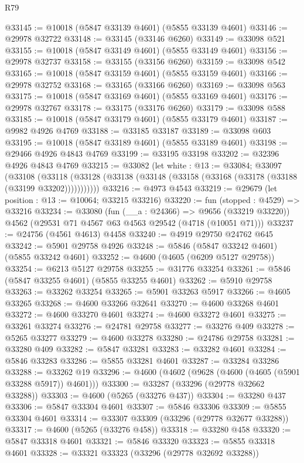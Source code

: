\begin{lexlean}{R79}
\begin{coremodule}
@33145 := @10018 (@5847 @33139 @4601) (@5855 @33139 @4601)
@33146 := @29978 @32722
@33148 := @33145 (@33146 @6260)
@33149 := @33098 @521
@33155 := @10018 (@5847 @33149 @4601) (@5855 @33149 @4601)
@33156 := @29978 @32737
@33158 := @33155 (@33156 @6260)
@33159 := @33098 @542
@33165 := @10018 (@5847 @33159 @4601) (@5855 @33159 @4601)
@33166 := @29978 @32752
@33168 := @33165 (@33166 @6260)
@33169 := @33098 @563
@33175 := @10018 (@5847 @33169 @4601) (@5855 @33169 @4601)
@33176 := @29978 @32767
@33178 := @33175 (@33176 @6260)
@33179 := @33098 @588
@33185 := @10018 (@5847 @33179 @4601) (@5855 @33179 @4601)
@33187 := @9982 @4926 @4769
@33188 := @33185 @33187
@33189 := @33098 @603
@33195 := @10018 (@5847 @33189 @4601) (@5855 @33189 @4601)
@33198 := @29466 @4926 @4843 @4769
@33199 := @33195 @33198
@33202 := @32396 @4926 @4843 @4769
@33215 := @33082
    (let white : @13 := @33084;
    @33097
      (@33108
        (@33118 (@33128 (@33138 (@33148 (@33158 (@33168 (@33178 (@33188 (@33199 @33202)))))))))))
@33216 := @4973 @4543
@33219 := @29679 (let position : @13 := @10064; @33215 @33216)
@33220 := fun (stopped : @4529) => @33216
@33234 := @33080
    (fun (__a : @24366) => @9656 (@33219 @33220))
    @4562
    (@29531 @71 @4567 @63 @4563 @29542 (@4718 (@10051 @71)))
@33237 := @24756 (@4561 @4613) @4458
@33240 := @4919 @29750 @24762 @645
@33242 := @5901 @29758 @4926
@33248 := @5846 (@5847 @33242 @4601) (@5855 @33242 @4601)
@33252 := @4600 (@4605 (@6209 @5127 @29758))
@33254 := @6213 @5127 @29758
@33255 := @31776 @33254
@33261 := @5846 (@5847 @33255 @4601) (@5855 @33255 @4601)
@33262 := @5910 @29758
@33263 := @33262 @33254
@33265 := @5901 @33263 @5917
@33266 := @4605 @33265
@33268 := @4600 @33266 @32641
@33270 := @4600 @33268 @4601
@33272 := @4600 @33270 @4601
@33274 := @4600 @33272 @4601
@33275 := @33261 @33274
@33276 := @24781 @29758
@33277 := @33276 @409
@33278 := @5265 @33277
@33279 := @4600 @33278
@33280 := @24786 @29758
@33281 := @33280 @409
@33282 := @5847 @33281
@33283 := @33282 @4601
@33284 := @5846 @33283
@33286 := @5855 @33281 @4601
@33287 := @33284 @33286
@33288 := @33262 @19
@33296 := @4600 (@4602 (@9628 (@4600 (@4605 (@5901 @33288 @5917)) @4601)))
@33300 := @33287 (@33296 (@29778 @32662 @33288))
@33303 := @4600 (@5265 (@33276 @437))
@33304 := @33280 @437
@33306 := @5847 @33304 @4601
@33307 := @5846 @33306
@33309 := @5855 @33304 @4601
@33314 := @33307 @33309 (@33296 (@29778 @32677 @33288))
@33317 := @4600 (@5265 (@33276 @458))
@33318 := @33280 @458
@33320 := @5847 @33318 @4601
@33321 := @5846 @33320
@33323 := @5855 @33318 @4601
@33328 := @33321 @33323 (@33296 (@29778 @32692 @33288))

\end{coremodule}
\end{lexlean}
